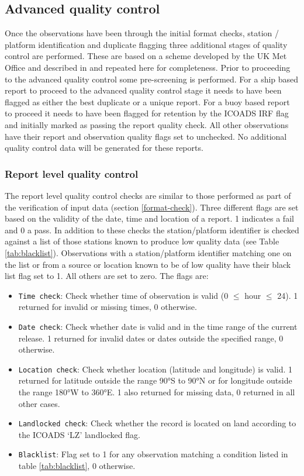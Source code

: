 {\FloatBarrier
\subsection{Advanced quality control}
Once the observations have been through the initial format checks, station / platform identification and duplicate flagging three additional stages of quality control are performed. 
These are based on a scheme developed by the UK Met Office and described in \cite{Kennedy2019} and repeated here for completeness.
Prior to proceeding to the advanced quality control some pre-screening is performed.
For a ship based report to proceed to the advanced quality control stage it needs to have been flagged as either the best duplicate or a unique report.
For a buoy based report to proceed it needs to have been flagged for retention by the ICOADS IRF flag and initially marked as passing the report quality check.
All other observations have their report and observation quality flags set to unchecked. No additional quality control data will be generated for these reports.

\FloatBarrier
\subsubsection{Report level quality control} \label{report-qc}
The report level quality control checks are similar to those performed as part of the verification of input data (section \ref{format-check}).
Three different flags are set based on the validity of the date, time and location of a report. 1 indicates a fail and 0 a pass.
In addition to these checks the station/platform identifier is checked against a list of those stations known to produce low quality data (see Table \ref{tab:blacklist}). 
Observations with a station/platform identifier matching one on the list or from a source or location known to be of low quality have their black list flag set to 1. All others are set to zero.
The flags are:
\begin{itemize}
\item \texttt{Time check}: Check whether time of observation is valid (0 $\leq$ hour $\leq$ 24). 1 returned for invalid or missing times, 0 otherwise.
\item \texttt{Date check}: Check whether date is valid and in the time range of the current release. 1 returned for invalid dates or dates outside the specified range, 0 otherwise.
\item \texttt{Location check}: Check whether location (latitude and longitude) is valid. 1 returned for latitude outside the range 90°S to 90°N or for longitude outside the range 180°W to 360°E. 1 also returned for missing data, 0 returned in all other cases.
\item \texttt{Landlocked check}: Check whether the record is located on land according to the ICOADS `LZ' landlocked flag.
\item \texttt{Blacklist}: Flag set to 1 for any observation matching a condition listed in table \ref{tab:blacklist}, 0 otherwise.
\end{itemize}

}
